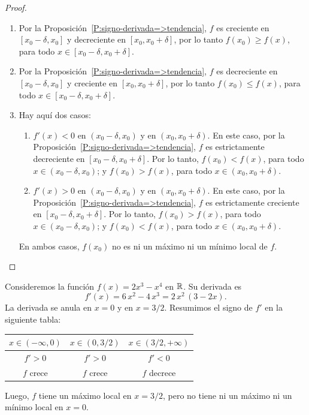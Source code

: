 \begin{proof}
    \begin{enumerate}
        \item Por la Proposición~\ref{P:signo-derivada=>tendencia}, $f$ es creciente en $[x_0-\delta,x_0]$ y decreciente en $[x_0,x_0+\delta]$, por lo tanto $f(x_0)\ge f(x)$, para todo $x\in[x_0-\delta,x_0+\delta]$.
        \item Por la Proposición~\ref{P:signo-derivada=>tendencia}, $f$ es decreciente en $[x_0-\delta,x_0]$ y creciente en $[x_0,x_0+\delta]$, por lo tanto $f(x_0)\le f(x)$, para todo $x\in[x_0-\delta,x_0+\delta]$.
        \item Hay aquí dos casos:
        \begin{enumerate}
            \item $f'(x)<0$ en $(x_0-\delta,x_0)$ y en $(x_0,x_0+\delta)$. En este caso, por la Proposición~\ref{P:signo-derivada=>tendencia}, $f$ es estrictamente decreciente en $[x_0-\delta,x_0+\delta]$.
            Por lo tanto, $f(x_0)<f(x)$, para todo $x\in (x_0-\delta,x_0)$; y
            $f(x_0)>f(x)$, para todo $x\in (x_0,x_0+\delta)$.
            \item $f'(x)>0$ en $(x_0-\delta,x_0)$ y en $(x_0,x_0+\delta)$. En este caso, por la Proposición~\ref{P:signo-derivada=>tendencia}, $f$ es estrictamente creciente en $[x_0-\delta,x_0+\delta]$.
            Por lo tanto, $f(x_0)>f(x)$, para todo $x\in (x_0-\delta,x_0)$; y
            $f(x_0)<f(x)$, para todo $x\in (x_0,x_0+\delta)$.
        \end{enumerate}
        En ambos casos, $f(x_0)$ no es ni un máximo ni un mínimo local de $f$.\qedhere
    \end{enumerate}
\end{proof}

\begin{example}
    Consideremos la función $f(x) = 2x^3-x^4$ en $\mathbb{R}$. Su derivada es
    $$ f'(x) = 6\,x^2-4\,x^3 = 2\, x^2\, (3-2x).$$
    La derivada se anula en $x=0$ y en $x=3/2$. Resumimos el signo de $f'$ en la siguiente tabla:

    \begin{center}
\def\arraystretch{1.5}
\begin{tabular}{|c|c|c|}
            \hline
            $x \in(-\infty,0)$ & $x\in(0, 3/2)$ & $x\in(3/2,+\infty)$ \\
            \hline
            $f'>0$& 
            $f'>0$ & 
            $f'<0$ \\
            \hline
            $f$ crece & 
            $f$ crece & 
            $f$ decrece \\
            \hline
        \end{tabular}
    \end{center}
    Luego, $f$ tiene un máximo local en $x=3/2$, pero no tiene ni un máximo ni un mínimo local en $x=0$.
\end{example}

